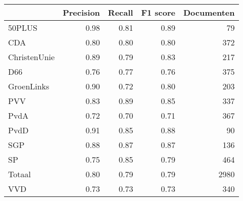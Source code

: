 \begin{tabular}{lrrrr}
\toprule
{} &  Precision &  Recall &  F1 score &  Documenten \\
\midrule
50PLUS       &       0.98 &    0.81 &      0.89 &          79 \\
CDA          &       0.80 &    0.80 &      0.80 &         372 \\
ChristenUnie &       0.89 &    0.79 &      0.83 &         217 \\
D66          &       0.76 &    0.77 &      0.76 &         375 \\
GroenLinks   &       0.90 &    0.72 &      0.80 &         203 \\
PVV          &       0.83 &    0.89 &      0.85 &         337 \\
PvdA         &       0.72 &    0.70 &      0.71 &         367 \\
PvdD         &       0.91 &    0.85 &      0.88 &          90 \\
SGP          &       0.88 &    0.87 &      0.87 &         136 \\
SP           &       0.75 &    0.85 &      0.79 &         464 \\
Totaal       &       0.80 &    0.79 &      0.79 &        2980 \\
VVD          &       0.73 &    0.73 &      0.73 &         340 \\
\bottomrule
\end{tabular}
